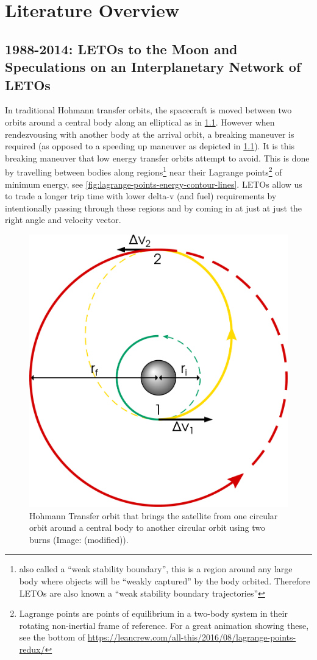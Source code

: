 
\chapter{Literature Overview}
\section{1988-2014: LETOs to the Moon and Speculations on an Interplanetary Network of LETOs}
In traditional Hohmann transfer orbits, the spacecraft is moved between two orbits around a central body along an elliptical as in \cref{fig:hohmann}. However when rendezvousing with another body at the arrival orbit, a breaking maneuver is required (as opposed to a speeding up maneuver as depicted in \cref{fig:hohmann}). It is this breaking maneuver that low energy transfer orbits attempt to avoid. This is done by travelling between bodies along regions\footnote{also called a ``weak stability boundary'', this is a region around any large body where objects will be ``weakly captured'' by the body orbited. Therefore LETOs are also known a ``weak stability boundary trajectories''} near their Lagrange points\footnote{Lagrange points are points of equilibrium in a two-body system in their rotating non-inertial frame of reference. For a great animation showing these, see the bottom of \url{https://leancrew.com/all-this/2016/08/lagrange-points-redux/}} of minimum energy, see \cref{fig:lagrange-points-energy-contour-lines}. LETOs allow us to trade a longer trip time with lower delta-v (and fuel) requirements by intentionally passing through these regions and by coming in at just at just the right angle and velocity vector.

\begin{figure}[ht]
    \centering
    \includegraphics[width=0.4\linewidth]{fig/hohmann.pdf}
    \caption{Hohmann Transfer orbit that brings the satellite from one circular orbit around a central body to another circular orbit using two burns (Image: \cite{Leafnode} (modified)).}
    \label{fig:hohmann}
\end{figure}

